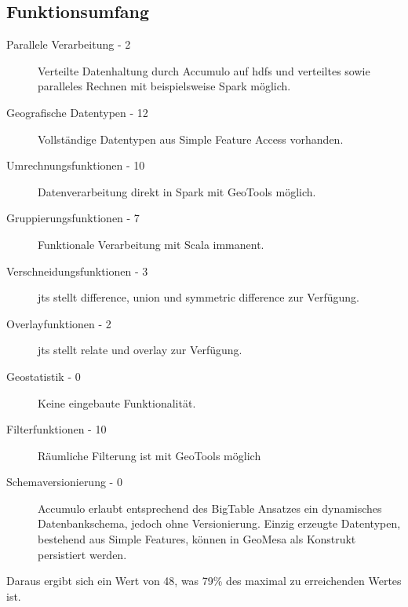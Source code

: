 \subsection{Funktionsumfang}
\begin{description}
\item[Parallele Verarbeitung - 2] Verteilte Datenhaltung durch Accumulo auf \Gls{hdfs} und verteiltes sowie paralleles Rechnen mit beispielsweise Spark möglich. \cite{website:geomesaeclipse}
\item[Geografische Datentypen - 12] Vollständige Datentypen aus Simple Feature Access vorhanden. \cite{website:geomesaeclipse}
\item[Umrechnungsfunktionen - 10] Datenverarbeitung direkt in Spark mit GeoTools möglich. \cite{website:geotools-crs}
\item[Gruppierungsfunktionen - 7] Funktionale Verarbeitung mit Scala immanent.
\item[Verschneidungsfunktionen - 3] \Gls{jts} stellt difference, union und symmetric difference zur Verfügung. \cite[S.29 ff.]{website:jts-vivid}
\item[Overlayfunktionen - 2] \Gls{jts} stellt relate und overlay zur Verfügung.
\item[Geostatistik - 0] Keine eingebaute Funktionalität.
\item[Filterfunktionen - 10] Räumliche Filterung ist mit GeoTools möglich \cite{website:geotools}
\item[Schemaversionierung - 0] Accumulo erlaubt entsprechend des BigTable Ansatzes ein dynamisches Datenbankschema, jedoch ohne Versionierung. Einzig erzeugte Datentypen, bestehend aus Simple Features, können in GeoMesa als Konstrukt persistiert werden.
\end{description}
Daraus ergibt sich ein Wert von 48, was 79\% des maximal zu erreichenden Wertes ist.

